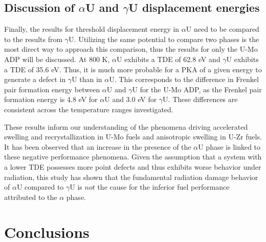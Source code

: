 \documentclass[review]{elsarticle}
\begin{document}
\subsection{Discussion of $\alpha$U and $\gamma$U displacement energies}

Finally, the results for threshold displacement energy in $\alpha$U need to be compared to the results from $\gamma$U. Utilizing the same potential to compare two phases is the most direct way to approach this comparison, thus the results for only the U-Mo ADP will be discussed. At 800 K, $\alpha$U exhibits a TDE of 62.8 eV and $\gamma$U exhibits a TDE of 35.6 eV. Thus, it is much more probable for a PKA of a given energy to generate a defect in $\gamma$U than in $\alpha$U. This corresponds to the difference in Frenkel pair formation energy between $\alpha$U and $\gamma$U for the U-Mo ADP, as the Frenkel pair formation energy is 4.8 eV for $\alpha$U and 3.0 eV for $\gamma$U. These differences are consistent across the temperature ranges investigated.

These results inform our understanding of the phenomena driving accelerated swelling and recrystallization in U-Mo fuels and anisotropic swelling in U-Zr fuels. It has been observed that an increase in the presence of the $\alpha$U phase is linked to these negative performance phenomena. Given the assumption that a system with a lower TDE possesses more point defects and thus exhibits worse behavior under radiation, this study has shown that the fundamental radiation damage behavior of $\alpha$U compared to $\gamma$U is $\textit{not}$ the cause for the inferior fuel performance attributed to the $\alpha$ phase.

\FloatBarrier

\section{Conclusions}
\end{document}
